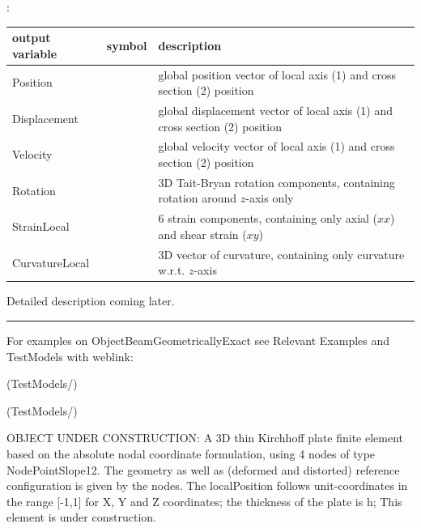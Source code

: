 :
\begin{center}
\footnotesize
\begin{longtable}{| p{5cm} | p{5cm} | p{6cm} |} 
\hline
\bf output variable & \bf symbol & \bf description \\ \hline
Position &  & global position vector of local axis (1) and cross section (2) position\\ \hline
Displacement &  & global displacement vector of local axis (1) and cross section (2) position\\ \hline
Velocity &  & global velocity vector of local axis (1) and cross section (2) position\\ \hline
Rotation &  & 3D Tait-Bryan rotation components, containing rotation around $z$-axis only\\ \hline
StrainLocal &  & 6 strain components, containing only axial ($xx$) and shear strain ($xy$)\\ \hline
CurvatureLocal &  & 3D vector of curvature, containing only curvature w.r.t. $z$-axis\\ \hline
\end{longtable}
\end{center}
 \noindent
    Detailed description coming later.
\vspace{6pt}\par\noindent\rule{\textwidth}{0.4pt}
%
\noindent For examples on ObjectBeamGeometricallyExact see Relevant Examples and TestModels with weblink:
\bi
\item {} (TestModels/)
\item {} (TestModels/)

\ei

%
\newpage


\label{sec:item:ObjectANCFThinPlate}
OBJECT UNDER CONSTRUCTION: A 3D thin Kirchhoff plate finite element based on the absolute nodal coordinate formulation, using 4 nodes of type NodePointSlope12. The geometry as well as (deformed and distorted) reference configuration is given by the nodes. The localPosition follows unit-coordinates in the range [-1,1] for X, Y and Z coordinates; the thickness of the plate is h; This element is under construction.
\vspace{12pt}\\

